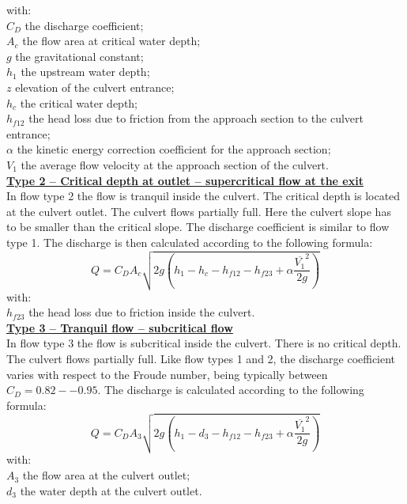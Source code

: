 with:\\
$C_D$ the discharge coefficient;\\
$A_c$ the flow area at critical water depth; \\
$g$ the gravitational constant; \\
$h_1$ the upstream water depth; \\
$z$ elevation of the culvert entrance; \\
$h_c$ the critical water depth; \\
$h_{f12}$ the head loss due to friction from the approach section to the culvert entrance; \\
$\alpha$ the kinetic energy correction coefficient for the approach section; \\
$V_1$ the average flow velocity at the approach section of the culvert.\\

\underline{\textbf{Type 2 -- Critical depth at outlet – supercritical flow at the exit}}\\

In flow type 2 the flow is tranquil inside the culvert. The critical depth is located at
the culvert outlet. The culvert flows partially full. Here the culvert slope has to be
smaller than the critical slope. The discharge coefficient is similar to flow type 1.
The discharge is then calculated according to the following formula:
\begin{equation}
Q=C_D A_c \sqrt{2g\left(h_1-h_c-h_{f12}-h_{f23}+\alpha \dfrac{\overline{V_1}^2}{2g}\right)}
\end{equation}
with:\\
$h_{f23}$ the head loss due to friction inside the culvert.\\

\underline{\textbf{Type 3 -- Tranquil flow -- subcritical flow}}\\

In flow type 3 the flow is subcritical inside the culvert. There is no critical depth.
The culvert flows partially full. Like flow types 1 and 2, the discharge coefficient
varies with respect to the Froude number, being typically between $C_D=0.82 -- 0.95$.
The discharge is calculated according to the following formula:
\begin{equation}
Q=C_D A_3 \sqrt{2g\left(h_1-d_3-h_{f12}-h_{f23}+\alpha \dfrac{\overline{V_1}^2}{2g}\right)}
\end{equation}
with:\\
$A_3$ the flow area at the culvert outlet;\\
$d_3$ the water depth at the culvert outlet.\\

